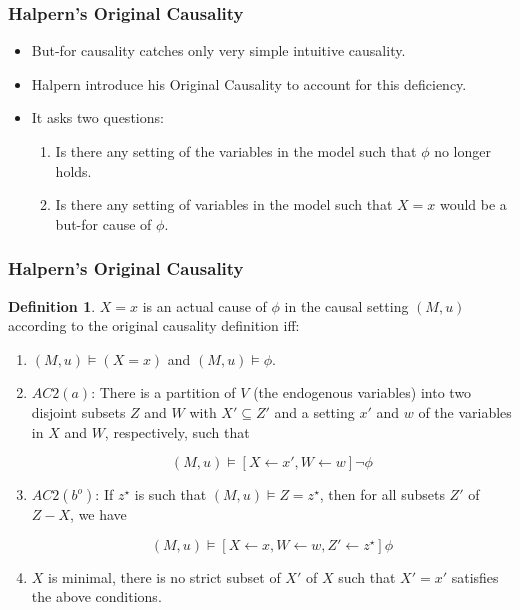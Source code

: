 \documentclass{beamer}
\theoremstyle{plain}
\theoremstyle{definition}
\newtheorem{defn}[thm]{Definition} %
\begin{document}
\begin{frame}
\frametitle{Halpern's Original Causality}
\begin{itemize}
\item But-for causality catches only very simple intuitive causality.
\item Halpern introduce his Original Causality to account for this deficiency.
\item It asks two questions:
\begin{enumerate}
\item Is there any setting of the variables in the model such that $\phi$ no longer holds.
\item Is there any setting of variables in the model such that $X=x$ would be a but-for cause of $\phi$.
\end{enumerate}
\end{itemize}

\end{frame}


\begin{frame}
\frametitle{Halpern's Original Causality}
\begin{defn}$X=x$ is an actual cause of $\phi$ in the causal setting $(M,u)$ according to the original causality definition iff:
\begin{enumerate}
\item $(M,u) \models (X=x)$ and $(M,u) \models \phi$.
\item $AC2(a)$: There is a partition of $V$ (the endogenous variables) into two disjoint subsets $Z$ and $W$ with $X'\subseteq Z'$ and a setting $x'$ and $w$ of the variables in $X$ and $W$, respectively, such that

\[
(M,u) \models [X\leftarrow x', W\leftarrow w]\lnot \phi
\] 

\item $AC2(b^o)$: If $z^\star$ is such that $(M,u)\models Z = z^\star$, then for all subsets $Z'$ of $Z-X$, we have

\[
(M,u) \models [X\leftarrow x, W \leftarrow w, Z' \leftarrow z^\star]\phi
\] 

\item $X$ is minimal, there is no strict subset of $X'$ of $X$ such that $X' = x'$ satisfies the above conditions.
\end{enumerate}

\end{defn}
\end{frame}
\end{document}
